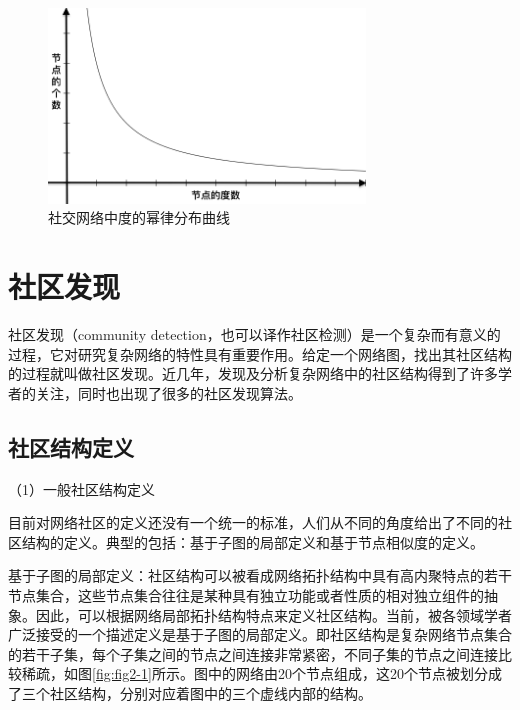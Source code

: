 \begin{figure}
  \centering
  \includegraphics[width=0.75\textwidth]{figures/powerlaw}
  \caption{社交网络中度的幂律分布曲线}\label{fig:powerlaw}
\end{figure}

\section{社区发现}  

社区发现（community detection，也可以译作社区检测）是一个复杂而有意义的过程，它对研究复杂网络的特性具有重要作用。给定一个网络图，找出其社区结构的过程就叫做社区发现。近几年，发现及分析复杂网络中的社区结构得到了许多学者的关注，同时也出现了很多的社区发现算法。

\subsection{社区结构定义}

（1）一般社区结构定义

目前对网络社区的定义还没有一个统一的标准，人们从不同的角度给出了不同的社区结构的定义。典型的包括：基于子图的局部定义和基于节点相似度的定义。

基于子图的局部定义：社区结构可以被看成网络拓扑结构中具有高内聚特点的若干节点集合，这些节点集合往往是某种具有独立功能或者性质的相对独立组件的抽象。因此，可以根据网络局部拓扑结构特点来定义社区结构。当前，被各领域学者广泛接受的一个描述定义是基于子图的局部定义。即社区结构是复杂网络节点集合的若干子集，每个子集之间的节点之间连接非常紧密，不同子集的节点之间连接比较稀疏，如图\ref{fig:fig2-1}所示。图中的网络由20个节点组成，这20个节点被划分成了三个社区结构，分别对应着图中的三个虚线内部的结构。

